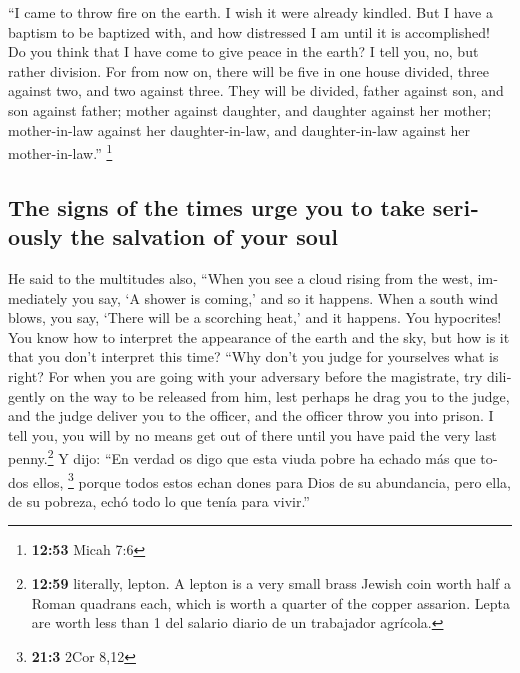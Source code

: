 \begin{paracol}{2}
\begin{otherlanguage}{english}
 ``I came to throw fire on the earth. I wish it were
already kindled.  But I have a baptism to be baptized
with, and how distressed I am until it is accomplished! 
Do you think that I have come to give peace in the earth? I tell you,
no, but rather division.  For from now on, there will be
five in one house divided, three against two, and two against three.
 They will be divided, father against son, and son
against father; mother against daughter, and daughter against her
mother; mother-in-law against her daughter-in-law, and daughter-in-law
against her mother-in-law.'' \footnote{\textbf{12:53} Micah 7:6}

\hypertarget{the-signs-of-the-times-urge-you-to-take-seriously-the-salvation-of-your-soul}{%
\subsection{The signs of the times urge you to take seriously the
salvation of your
soul}\label{the-signs-of-the-times-urge-you-to-take-seriously-the-salvation-of-your-soul}}

 He said to the multitudes also, ``When you see a cloud
rising from the west, immediately you say, `A shower is coming,' and so
it happens.  When a south wind blows, you say, `There
will be a scorching heat,' and it happens.  You
hypocrites! You know how to interpret the appearance of the earth and
the sky, but how is it that you don't interpret this time?
 ``Why don't you judge for yourselves what is right?
 For when you are going with your adversary before the
magistrate, try diligently on the way to be released from him, lest
perhaps he drag you to the judge, and the judge deliver you to the
officer, and the officer throw you into prison.  I tell
you, you will by no means get out of there until you have paid the very
last penny.\footnote{\textbf{12:59} literally, lepton. A lepton is a
  very small brass Jewish coin worth half a Roman quadrans each, which
  is worth a quarter of the copper assarion. Lepta are worth less than 1
  del salario diario de un trabajador agrícola.}  Y dijo:
``En verdad os digo que esta viuda pobre ha echado más que todos ellos,
\footnote{\textbf{21:3} 2Cor 8,12}  porque todos estos
echan dones para Dios de su abundancia, pero ella, de su pobreza, echó
todo lo que tenía para vivir.''

\hypertarget{el-discurso-de-jesuxfas-en-el-monte-de-los-olivos-a-los-apuxf3stoles-sobre-la-destrucciuxf3n-del-templo-y-jerusaluxe9n-el-fin-de-este-mundo-y-su-apariciuxf3n-en-el-uxfaltimo-duxeda}{%
}
\end{otherlanguage}
\end{paracol}
